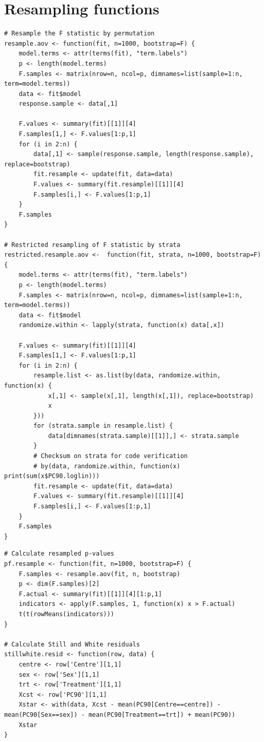 \section{Resampling functions}
\nopagebreak
\begin{lstlisting}[float=h,caption=Functions for resampling $F$ statistic,label=R:Fresamp]
# Resample the F statistic by permutation
resample.aov <- function(fit, n=1000, bootstrap=F) {
	model.terms <- attr(terms(fit), "term.labels")
	p <- length(model.terms)
	F.samples <- matrix(nrow=n, ncol=p, dimnames=list(sample=1:n, term=model.terms))
	data <- fit$model
	response.sample <- data[,1]

	F.values <- summary(fit)[[1]][4]
	F.samples[1,] <- F.values[1:p,1]
	for (i in 2:n) {
		data[,1] <- sample(response.sample, length(response.sample), replace=bootstrap)
		fit.resample <- update(fit, data=data)
		F.values <- summary(fit.resample)[[1]][4]
		F.samples[i,] <- F.values[1:p,1]
	}
	F.samples	
}

# Restricted resampling of F statistic by strata
restricted.resample.aov <-  function(fit, strata, n=1000, bootstrap=F) {
	model.terms <- attr(terms(fit), "term.labels")
	p <- length(model.terms)
	F.samples <- matrix(nrow=n, ncol=p, dimnames=list(sample=1:n, term=model.terms))
	data <- fit$model
	randomize.within <- lapply(strata, function(x) data[,x])

	F.values <- summary(fit)[[1]][4]
	F.samples[1,] <- F.values[1:p,1]
	for (i in 2:n) {
		resample.list <- as.list(by(data, randomize.within, function(x) {
			x[,1] <- sample(x[,1], length(x[,1]), replace=bootstrap)
			x
		}))
		for (strata.sample in resample.list) {
			data[dimnames(strata.sample)[[1]],] <- strata.sample
		}
		# Checksum on strata for code verification
		# by(data, randomize.within, function(x) print(sum(x$PC90.loglin)))
		fit.resample <- update(fit, data=data)
		F.values <- summary(fit.resample)[[1]][4]
		F.samples[i,] <- F.values[1:p,1]
	}
	F.samples	
}
\end{lstlisting}

\begin{lstlisting}[float=h,caption=Functions to calculate resampled $p$-values and resampling residuals,label=R:resampmisc]
# Calculate resampled p-values
pf.resample <- function(fit, n=1000, bootstrap=F) {
	F.samples <- resample.aov(fit, n, bootstrap)
	p <- dim(F.samples)[2]
	F.actual <- summary(fit)[[1]][4][1:p,1]
	indicators <- apply(F.samples, 1, function(x) x > F.actual)
	t(t(rowMeans(indicators)))
}

# Calculate Still and White residuals
stillwhite.resid <- function(row, data) {
	centre <- row['Centre'][1,1]
	sex <- row['Sex'][1,1]
	trt <- row['Treatment'][1,1]
	Xcst <- row['PC90'][1,1]
	Xstar <- with(data, Xcst - mean(PC90[Centre==centre]) - mean(PC90[Sex==sex]) - mean(PC90[Treatment==trt]) + mean(PC90))
	Xstar
}
\end{lstlisting}

